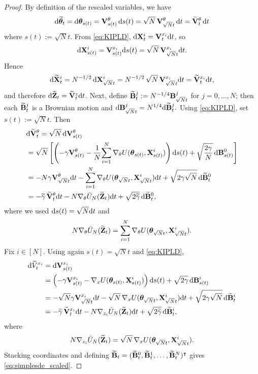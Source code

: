 \begin{proof}
By definition of the rescaled variables, we have
\begin{align*}
{\mathrm d}\widetilde{\bm\theta}_t = {\mathrm d} \bm\theta_{s(t)} = {\mathbf V}^\theta_{s(t)}\,{\mathrm d} s(t) = \sqrt{N}\,{\mathbf V}^\theta_{\sqrt N t}\,{\mathrm d} t = \widetilde{{\mathbf V}}^\theta_t\,{\mathrm d} t
\end{align*}
where $s(t):=\sqrt{N}t$. From \eqref{eq:KIPLD}, ${\mathrm d} {\mathbf X}_t^i={\mathbf V}_t^{x_i}{\mathrm d} t$, so
\begin{align*}
{\mathrm d} {\mathbf X}^i_{s(t)}
= {\mathbf V}^{x_i}_{s(t)}{\mathrm d} s(t)
= \sqrt{N}\,{\mathbf V}^{x_i}_{\sqrt{N}t}{\mathrm d} t.
\end{align*}
Hence
\begin{align*}
{\mathrm d} \widetilde{{\mathbf X}}_t^i
= N^{-1/2}\,{\mathrm d} {\mathbf X}^i_{\sqrt{N}t}
= N^{-1/2}\,\sqrt{N}\,{\mathbf V}^{x_i}_{\sqrt{N}t}{\mathrm d} t
= \widetilde{{\mathbf V}}_t^{x_i}{\mathrm d} t,
\end{align*}
and therefore ${\mathrm d} \widetilde{{\mathbf Z}}_t=\widetilde{{\mathbf V}}_t^z{\mathrm d} t$. Next, define $\widetilde{{\mathbf B}}_t^j:=N^{-1/4}{\mathbf B}_{\sqrt{N}t}^j$ for $j=0,\ldots,N$; then each $\widetilde{{\mathbf B}}_t^j$ is a Brownian motion and
\(
{\mathrm d} {\mathbf B}_{\sqrt{N}t}^j = N^{1/4}{\mathrm d} \widetilde{{\mathbf B}}_t^j.
\)
Using \eqref{eq:KIPLD}, set $s(t):=\sqrt{N}t$. Then
\small
\begin{align*}
&{\mathrm d} \widetilde{{\mathbf V}}_t^\theta
= \sqrt{N}\,{\mathrm d} {\mathbf V}^\theta_{s(t)}\\
&= \sqrt{N}\left[
\left(-\gamma {\mathbf V}^\theta_{s(t)}
- \frac{1}{N}\!\sum_{i=1}^N \nabla_\theta U(\bm{\theta}_{s(t)},{\mathbf X}^i_{s(t)})\right){\mathrm d} s(t)
+ \sqrt{\frac{2\gamma}{N}}\,{\mathrm d} {\mathbf B}^0_{s(t)}
\right]\\
&= -N\gamma {\mathbf V}^\theta_{\sqrt{N}t}{\mathrm d} t
- \sum_{i=1}^N \nabla_\theta U(\bm{\theta}_{\sqrt{N}t},{\mathbf X}^i_{\sqrt{N}t}){\mathrm d} t  + \sqrt{2\gamma\sqrt{N}}\,{\mathrm d} \widetilde{{\mathbf B}}_t^0\\
&= -\widetilde{\gamma}\,\widetilde{{\mathbf V}}_t^\theta{\mathrm d} t
- N\nabla_\theta \bar{U}_N(\widetilde{{\mathbf Z}}_t){\mathrm d} t
+ \sqrt{2\widetilde{\gamma}}\,{\mathrm d} \widetilde{{\mathbf B}}_t^0,
\end{align*}
\normalsize
where we used ${\mathrm d} s(t)=\sqrt{N}{\mathrm d} t$ and
\[
N\nabla_\theta \bar{U}_N(\widetilde{{\mathbf Z}}_t)
= \sum_{i=1}^N \nabla_\theta U(\bm{\theta}_{\sqrt{N}t},{\mathbf X}^i_{\sqrt{N}t}).
\]
Fix $i\in[N]$. Using again $s(t)=\sqrt{N}t$ and \eqref{eq:KIPLD},
\small
\begin{align*}
{\mathrm d} \widetilde{V}_t^{x_i}
&= {\mathrm d} {\mathbf V}^{x_i}_{s(t)}\\
&= \left(-\gamma {\mathbf V}^{x_i}_{s(t)}
- \nabla_x U(\bm{\theta}_{s(t)},{\mathbf X}^i_{s(t)})\right){\mathrm d} s(t)  + \sqrt{2\gamma}\,{\mathrm d} {\mathbf B}^i_{s(t)} \\
&= -\sqrt{N}\gamma {\mathbf V}^{x_i}_{\sqrt{N}t}{\mathrm d} t
- \sqrt{N}\,\nabla_x U(\bm{\theta}_{\sqrt{N}t},{\mathbf X}^i_{\sqrt{N}t}){\mathrm d} t
 + \sqrt{2\gamma\sqrt{N}}\,{\mathrm d} \widetilde{{\mathbf B}}_t^i\\
&= -\widetilde{\gamma}\,\widetilde{{\mathbf V}}_t^{x_i}{\mathrm d} t
- N\nabla_{z_i}\bar{U}_N(\widetilde{{\mathbf Z}}_t){\mathrm d} t
+ \sqrt{2\widetilde{\gamma}}\,{\mathrm d} \widetilde{{\mathbf B}}_t^i,
\end{align*}
\normalsize
where
\[
N\nabla_{z_i}\bar{U}_N(\widetilde{{\mathbf Z}}_t)
= \sqrt{N}\,\nabla_x U(\bm{\theta}_{\sqrt{N}t},{\mathbf X}^i_{\sqrt{N}t}).
\]
Stacking coordinates and defining
\(
\widetilde{{\mathbf B}}_t
= (\widetilde{{\mathbf B}}_t^0,\widetilde{{\mathbf B}}_t^1,\ldots,\widetilde{{\mathbf B}}_t^N)^\intercal
\)
gives \eqref{eq:simplesde_scaled}.
\end{proof}

